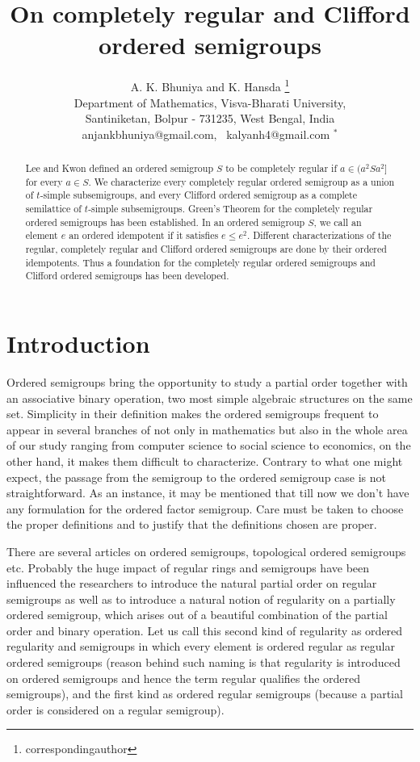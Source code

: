 \documentclass[13pt]{article}
\title{\Large \bf On completely regular and Clifford  ordered semigroups}
\author{A. K. Bhuniya and K. Hansda \footnote{correspondingauthor} \\
\normalsize{Department of Mathematics, Visva-Bharati
University,}\\
\normalsize{Santiniketan, Bolpur - 731235, West Bengal, India}\\
\normalsize{anjankbhuniya@gmail.com}, \
\normalsize{kalyanh4@gmail.com $^*$}}
\date{}
\theoremstyle{definition}
\theoremstyle{remark}
\numberwithin{equation}{section}
\begin{document}
\maketitle


\begin{abstract}{\footnotesize}
Lee and Kwon \cite{LK}  defined an ordered semigroup $S$ to be
completely regular if $a \in (a^2Sa^2]$ for every $a \in S$. We
characterize every completely regular ordered semigroup as a union
of $t$-simple subsemigroups, and every Clifford ordered semigroup as
a complete semilattice of $t$-simple subsemigroups. Green's Theorem
for the completely regular ordered semigroups has been established.
In an ordered semigroup $S$, we call an element $e$ an ordered
idempotent if it satisfies $e \leq e^2$. Different characterizations
of the regular, completely regular and Clifford ordered semigroups
are done by their ordered idempotents. Thus a foundation for the
completely regular ordered semigroups and Clifford ordered
semigroups has been developed.
\end{abstract}





\section{Introduction}
Ordered semigroups bring the opportunity to study a partial order
together with an associative binary operation, two most simple
algebraic structures on the same set. Simplicity in their definition
makes the ordered semigroups frequent to appear in several branches
of not only in mathematics but also in the whole area of our study
ranging from computer science to social science to economics, on the
other hand, it makes them difficult to characterize.  Contrary to
what one might expect, the passage from the semigroup to the ordered
semigroup case is not straightforward. As an instance, it may be
mentioned that till now we don't have any formulation for the
ordered factor semigroup. Care must be taken to choose the proper
definitions and to justify that the definitions chosen are proper.

There are several articles on ordered semigroups, topological
ordered semigroups etc. Probably the huge impact of regular rings
and semigroups have been influenced the researchers  to introduce
the  natural partial order  on regular semigroups as well as to
introduce a  natural notion of regularity on a partially ordered
semigroup,  which arises out of a beautiful combination of the
partial order and binary operation. Let us call this second kind of
regularity as ordered regularity and semigroups in which every
element is ordered regular as regular ordered semigroups (reason
behind such naming is that regularity is introduced on ordered
semigroups and hence the term regular qualifies the ordered
semigroups), and the first kind as ordered regular semigroups
(because a partial order is considered on a regular semigroup).
\end{document}
